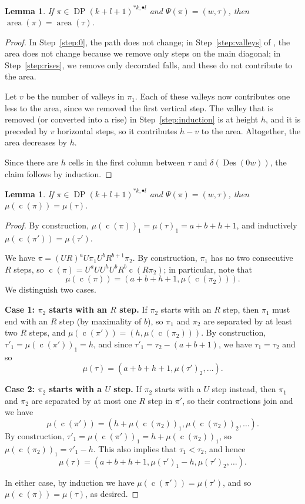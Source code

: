 \documentclass[reqno]{amsart}
\theoremstyle{plain}
\newtheorem{lemma}[theorem]{Lemma}
\theoremstyle{definition}
\theoremstyle{remark}
\DeclareMathOperator{\DP}{DP}
\DeclareMathOperator{\area}{area}
\DeclareMathOperator{\Des}{Des}
\DeclareMathOperator{\cc}{c}
\newcommand{\<}{\langle}
\renewcommand{\>}{\rangle}
\begin{document}
\begin{lemma}
    \label{lem:area}
    If $\pi \in \DP(k+l+1)^{\ast k, \bullet l}$ and $\Psi(\pi) = (w,\tau)$, then $\area(\pi) = \area(\tau)$.
\end{lemma}

\begin{proof}
    In Step~\ref{step:0}, the path does not change; in Step~\ref{step:valleys} of , the area does not change because we remove only steps on the main diagonal; in Step~\ref{step:rises}, we remove only decorated falls, and these do not contribute to the area.

    Let $v$ be the number of valleys in $\pi_1$. Each of these valleys now contributes one less to the area, since we removed the first vertical step. The valley that is removed (or converted into a rise) in Step~\ref{step:induction} is at height $h$, and it is preceded by $v$ horizontal steps, so it contributes $h-v$ to the area. Altogether, the area decreases by $h$.

    Since there are $h$ cells in the first column between $\tau$ and $\delta(\Des(0w))$, the claim follows by induction.
\end{proof}

\begin{lemma}
    \label{lem:comp}
    If $\pi \in \DP(k+l+1)^{\ast k, \bullet l}$ and $\Psi(\pi) = (w,\tau)$, then $\mu(\cc(\pi)) = \mu(\tau)$.
\end{lemma}

\begin{proof}
    By construction, $\mu(\cc(\pi))_1 = \mu(\tau)_1 = a+b+h+1$, and inductively $\mu(\cc(\pi')) = \mu(\tau')$.
    
    We have $\pi = (UR)^a U \pi_1 U^b R^{b+1} \pi_2$. By construction, $\pi_1$ has no two consecutive $R$ steps, so $\cc(\pi) = U^a U U^h U^b R^b \cc(R \pi_2)$; in particular, note that
    \[ \mu(\cc(\pi)) = (a+b+h+1, \mu(\cc(\pi_2))). \]    
    We distinguish two cases.

    \textbf{Case 1: $\pi_2$ starts with an $R$ step.}    
    If $\pi_2$ starts with an $R$ step, then $\pi_1$ must end with an $R$ step (by maximality of $b$), so $\pi_1$ and $\pi_2$ are separated by at least two $R$ steps, and $\mu(\cc(\pi')) = (h, \mu(\cc(\pi_2)))$.
    By construction, $\tau'_1 = \mu(\cc(\pi'))_1 = h$, and since $\tau'_1 = \tau_2 - (a+b+1)$, we have $\tau_1 = \tau_2$ and so
    \[ \mu(\tau) = (a+b+h+1, \mu(\tau')_2, \dots). \]

    \textbf{Case 2: $\pi_2$ starts with a $U$ step.}
    If $\pi_2$ starts with a $U$ step instead, then $\pi_1$ and $\pi_2$ are separated by at most one $R$ step in $\pi'$, so their contractions join and we have
    \[ \mu(\cc(\pi')) = (h+\mu(\cc(\pi_2))_1, \mu(\cc(\pi_2))_2, \dots). \]
    By construction, $\tau'_1 = \mu(\cc(\pi'))_1 = h + \mu(\cc(\pi_2))_1$, so $\mu(\cc(\pi_2))_1=\tau'_1-h$. This also implies that $\tau_1 < \tau_2$, and hence
    \[ \mu(\tau) = (a+b+h+1, \mu(\tau')_1-h, \mu(\tau')_2, \dots). \]

    In either case, by induction we have $\mu(\cc(\pi')) = \mu(\tau')$, and so $\mu(\cc(\pi)) = \mu(\tau)$, as desired.
\end{proof}
\end{document}

